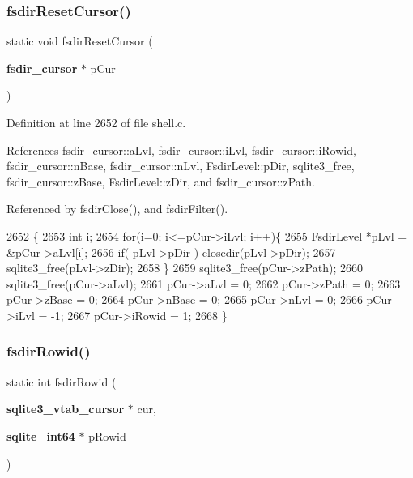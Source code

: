 \subsubsection{fsdir\+Reset\+Cursor()}
{\footnotesize\ttfamily static void fsdir\+Reset\+Cursor (\begin{DoxyParamCaption}\item[{\textbf{ fsdir\+\_\+cursor} $\ast$}]{p\+Cur }\end{DoxyParamCaption})\hspace{0.3cm}{\ttfamily [static]}}



Definition at line 2652 of file shell.\+c.



References fsdir\+\_\+cursor\+::a\+Lvl, fsdir\+\_\+cursor\+::i\+Lvl, fsdir\+\_\+cursor\+::i\+Rowid, fsdir\+\_\+cursor\+::n\+Base, fsdir\+\_\+cursor\+::n\+Lvl, Fsdir\+Level\+::p\+Dir, sqlite3\+\_\+free, fsdir\+\_\+cursor\+::z\+Base, Fsdir\+Level\+::z\+Dir, and fsdir\+\_\+cursor\+::z\+Path.



Referenced by fsdir\+Close(), and fsdir\+Filter().


\begin{DoxyCode}
2652                                                 \{
2653   \textcolor{keywordtype}{int} i;
2654   \textcolor{keywordflow}{for}(i=0; i<=pCur->iLvl; i++)\{
2655     FsdirLevel *pLvl = &pCur->aLvl[i];
2656     \textcolor{keywordflow}{if}( pLvl->pDir ) closedir(pLvl->pDir);
2657     sqlite3_free(pLvl->zDir);
2658   \}
2659   sqlite3_free(pCur->zPath);
2660   sqlite3_free(pCur->aLvl);
2661   pCur->aLvl = 0;
2662   pCur->zPath = 0;
2663   pCur->zBase = 0;
2664   pCur->nBase = 0;
2665   pCur->nLvl = 0;
2666   pCur->iLvl = -1;
2667   pCur->iRowid = 1;
2668 \}
\end{DoxyCode}
\mbox{\label{shell_8c_a4bc8159df4f5a8b7f41b34da47d42742}} 
\subsubsection{fsdir\+Rowid()}
{\footnotesize\ttfamily static int fsdir\+Rowid (\begin{DoxyParamCaption}\item[{\textbf{ sqlite3\+\_\+vtab\+\_\+cursor} $\ast$}]{cur,  }\item[{\textbf{ sqlite\+\_\+int64} $\ast$}]{p\+Rowid }\end{DoxyParamCaption})\hspace{0.3cm}{\ttfamily [static]}}



